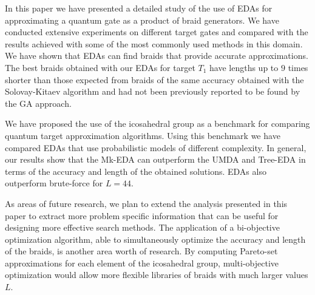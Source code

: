 In this paper we have presented a detailed study of the use of EDAs for approximating a quantum gate as a product of braid generators.  We have conducted extensive experiments on different target gates and compared with the results achieved with some of the most commonly used methods in this domain. We have shown that EDAs can find braids that provide accurate approximations. The best braids obtained with our EDAs for target $T_1$ have lengths  up to $9$ times shorter than those expected from braids of the same accuracy obtained with the Solovay-Kitaev algorithm and had not been previously reported to be found by the GA approach.

 We have proposed the use of the icosahedral group as a benchmark for comparing quantum target approximation algorithms. Using this benchmark we have compared EDAs that use probabilistic models of different complexity. In general, our results show that the Mk-EDA can outperform the UMDA and Tree-EDA in terms of the accuracy and length of the obtained solutions. EDAs also outperform brute-force for $L=44$. 

 As areas of future research, we plan to extend the analysis presented in this paper to extract more problem specific information that can be useful for designing more effective search methods. The application of a bi-objective optimization algorithm, able to simultaneously optimize the accuracy and length of the braids, is another area worth of research.  By computing Pareto-set approximations for each element of the icosahedral group, multi-objective optimization would allow more flexible libraries of braids with much larger values $L$. 
















